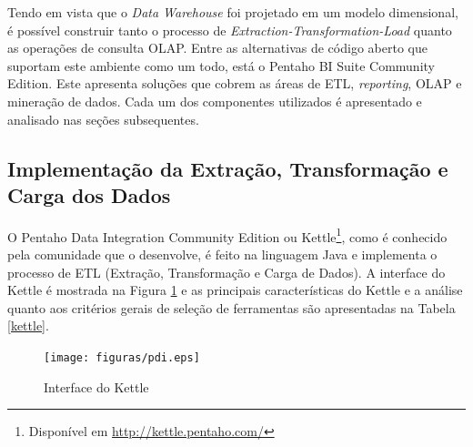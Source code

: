 Tendo em vista que o \textit{Data Warehouse} foi projetado em um modelo dimensional, é possível construir tanto o processo de \textit{Extraction-Transformation-Load} quanto as operações de consulta OLAP. Entre as alternativas de código aberto que suportam este ambiente como um todo, está o Pentaho BI Suite Community Edition. Este apresenta soluções que cobrem 
as áreas de ETL, \textit{reporting}, OLAP e mineração de dados. Cada um dos componentes utilizados é apresentado e analisado nas seções subsequentes.
 


\subsection{Implementação da Extração, Transformação e Carga dos Dados}
\label{implementação-ETL}
O Pentaho Data Integration Community Edition ou Kettle\footnote{Disponível em \url{http://kettle.pentaho.com/}}, como é conhecido pela comunidade que o desenvolve, é feito na linguagem Java e implementa o processo de ETL (Extração, Transformação e Carga de Dados). A interface do Kettle é mostrada na Figura \ref{pdi} e as principais características do Kettle e a análise quanto aos critérios gerais de seleção de ferramentas são apresentadas na Tabela \ref{kettle}.

\begin{figure}[ht!]
\centering
\texttt{[image: figuras/pdi.eps]}
\caption{Interface do Kettle}
\label{pdi}
\end{figure}
\FloatBarrier
 


